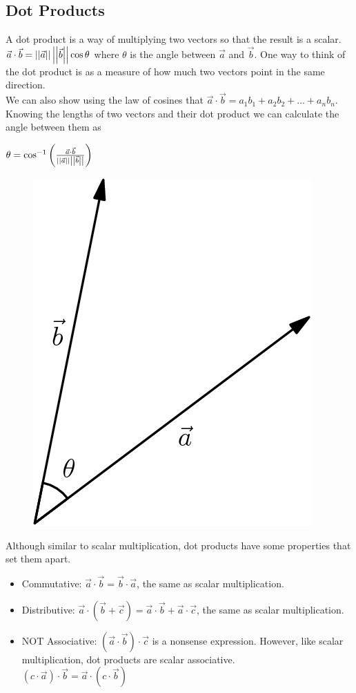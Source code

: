 \subsection{Dot Products}
\noindent
A dot product is a way of multiplying two vectors so that the result is a scalar. $\vec{a}\cdot\vec{b}=\left|\left|\vec{a}\right|\right|\left|\left|\vec{b}\right|\right|\cos{\theta}$ where $\theta$ is the angle between $\vec{a}$ and $\vec{b}$. One way to think of the dot product is as a measure of how much two vectors point in the same direction.\\
We can also show using the law of cosines that $\vec{a}\cdot\vec{b}=a_1b_1+a_2b_2+...+a_nb_n$.\\
Knowing the lengths of two vectors and their dot product we can calculate the angle between them as\\
\begin{center}
	$\theta=\cos^{-1}{\left(\frac{\vec{a}\cdot\vec{b}}{\left|\left|\vec{a}\right|\right|\left|\left|\vec{b}\right|\right|}\right)}$
\end{center}

\begin{figure}[h]
	\centering
	\includegraphics[scale=0.33]{Images/backgroundReview/DotProduct}
\end{figure}

\noindent
Although similar to scalar multiplication, dot products have some properties that set them apart.
\begin{itemize}
	\item Commutative: $\vec{a}\cdot\vec{b}=\vec{b}\cdot\vec{a}$, the same as scalar multiplication.
	\item Distributive: $\vec{a}\cdot\left(\vec{b}+\vec{c}\right)=\vec{a}\cdot\vec{b}+\vec{a}\cdot\vec{c}$, the same as scalar multiplication.
	\item NOT Associative: $\left(\vec{a}\cdot\vec{b}\right)\cdot\vec{c}$ is a nonsense expression. However, like scalar multiplication, dot products are scalar associative.\\ 
	$\left(c\cdot\vec{a}\right)\cdot\vec{b}=\vec{a}\cdot\left(c\cdot\vec{b}\right)$
\end{itemize}